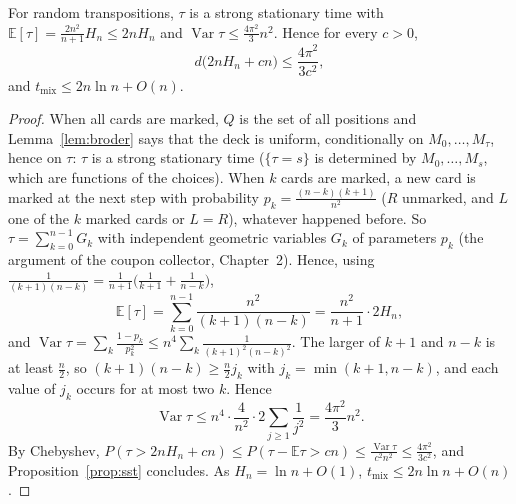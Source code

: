 \begin{theorem}[Broder]\label{thm:transpositions}
For random transpositions, $\tau$ is a strong stationary time with $\mathbb E[\tau]=\frac{2n^2}{n+1}H_n\le2nH_n$ and $\operatorname{Var}\tau\le\frac{4\pi^2}3n^2$. Hence for every $c>0$,
\[
d\bigl(2nH_n+cn\bigr)\le\frac{4\pi^2}{3c^2},
\]
and $t_{\mathrm{mix}}\le2n\ln n+O(n)$.
\end{theorem}
\begin{proof}
When all cards are marked, $Q$ is the set of all positions and Lemma~\ref{lem:broder} says that the deck is uniform, conditionally on
$M_0,\dots,M_\tau$, hence on $\tau$: $\tau$ is a strong stationary time ($\{\tau=s\}$ is determined by $M_0,\dots,M_s$, which are functions of the choices).
When $k$ cards are marked, a new card is marked at the next step with probability $p_k=\frac{(n-k)(k+1)}{n^2}$ ($R$ unmarked, and $L$ one of the $k$
marked cards or $L=R$), whatever happened before. So $\tau=\sum_{k=0}^{n-1}G_k$ with independent geometric variables $G_k$ of parameters $p_k$ (the
argument of the coupon collector, Chapter~2). Hence, using $\frac1{(k+1)(n-k)}=\frac1{n+1}\bigl(\frac1{k+1}+\frac1{n-k}\bigr)$,
\[
\mathbb E[\tau]=\sum_{k=0}^{n-1}\frac{n^2}{(k+1)(n-k)}=\frac{n^2}{n+1}\cdot2H_n,
\]
and $\operatorname{Var}\tau=\sum_k\frac{1-p_k}{p_k^2}\le n^4\sum_k\frac1{(k+1)^2(n-k)^2}$. The larger of $k+1$ and $n-k$ is at least $\frac n2$, so $(k+1)(n-k)\ge\frac n2j_k$ with
$j_k=\min(k+1,n-k)$, and each value of $j_k$ occurs for at most two $k$. Hence
\[
\operatorname{Var}\tau\le n^4\cdot\frac4{n^2}\cdot2\sum_{j\ge1}\frac1{j^2}=\frac{4\pi^2}3n^2.
\]
By Chebyshev, $P(\tau>2nH_n+cn)\le P(\tau-\mathbb E\tau>cn)\le\frac{\operatorname{Var}\tau}{c^2n^2}\le\frac{4\pi^2}{3c^2}$, and Proposition~\ref{prop:sst} concludes. As $H_n=\ln n+O(1)$, $t_{\mathrm{mix}}\le2n\ln n+O(n)$.
\end{proof}

